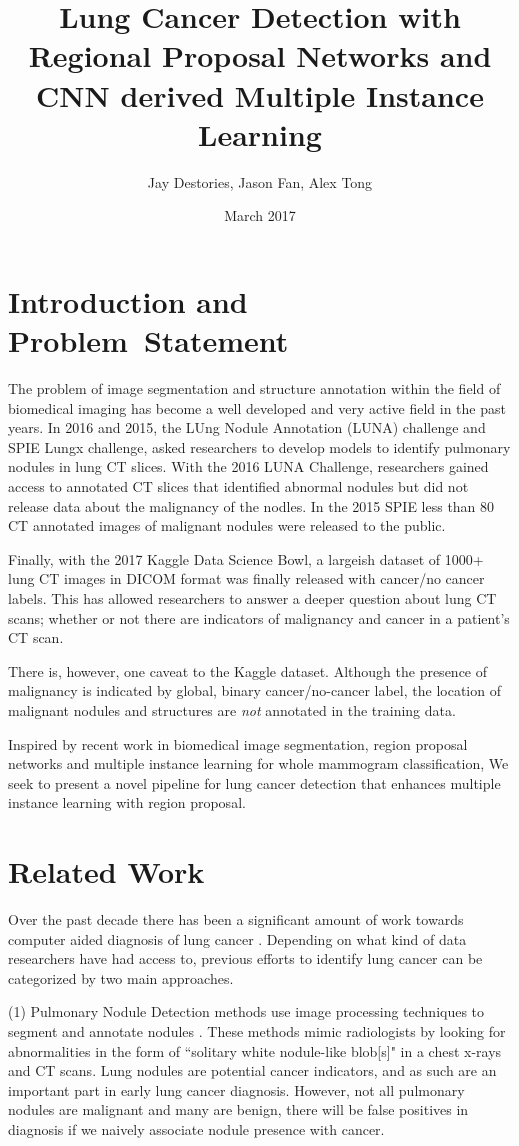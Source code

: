 \documentclass[twocolumn,10pt]{article}
\title{Lung Cancer Detection with Regional Proposal Networks and CNN derived
Multiple Instance Learning}
\author{Jay Destories, Jason Fan, Alex Tong}
\date{March 2017}
\newcommand{\red}[1]{{\color{red}#1}}
\begin{document}
\maketitle
\section{Introduction and \\Problem~Statement}
The problem of image segmentation and structure annotation within the 
field of biomedical imaging has become a well developed and very active field in
the past years. In 2016 and 2015, the LUng Nodule Annotation (LUNA) challenge and 
SPIE Lungx challenge, asked researchers to develop models to identify pulmonary 
nodules in lung CT slices. With the 2016 LUNA Challenge, researchers gained access
to annotated CT slices that identified abnormal nodules but did not release data
about the malignancy of the nodles. In the 2015 SPIE less than 80 CT annotated 
images of malignant nodules were released to the public.

Finally, with the 2017 Kaggle Data Science Bowl, a large\red{ish} dataset of
1000+ lung CT images in DICOM format was finally released with cancer/no cancer 
labels. This has allowed researchers to answer a deeper question about lung CT
scans; whether or not there are indicators of malignancy and cancer in a patient's
CT scan.

There is, however, one caveat to the Kaggle dataset. 
Although the presence of malignancy is indicated by global, binary 
cancer/no-cancer label, the location of malignant nodules and structures are
\textit{not} annotated in the training data.

Inspired by recent work in biomedical image segmentation, region proposal 
networks and multiple instance learning for whole mammogram classification,
We seek to present a novel pipeline for lung cancer detection that enhances
multiple instance learning with region proposal.

\section{Related Work}

Over the past decade there has been a significant amount of work towards 
computer aided diagnosis of lung cancer \cite{cad_1998}. Depending on what kind
of data researchers have had access to, previous efforts to identify lung cancer
can be categorized by two main approaches. 

(1) Pulmonary Nodule Detection methods use 
image processing techniques to segment and annotate nodules
\cite{FeatureBasedLungNoduleDetection_2017, 
     LungNoduleDetectionWeaklyLabeled_2016, U-net_2015}. These methods
mimic radiologists by looking for abnormalities in the form of
``solitary white nodule-like blob[s]" in a chest x-rays and CT scans.
Lung nodules are potential cancer indicators, and as such are an important part 
in early lung cancer diagnosis. However, not all pulmonary nodules are malignant
and many are benign, there will be false positives in diagnosis if we naively
associate nodule presence with cancer. 
\end{document}
